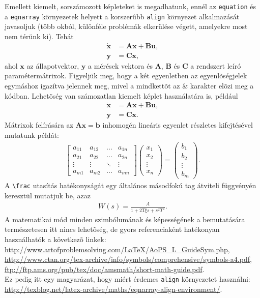Emellett kiemelt, sorszámozott képleteket is megadhatunk, ennél az \verb+equation+ és a \verb+eqnarray+ környezetek helyett a korszerûbb \verb+align+ környezet alkalmazását javasoljuk (több okból, különféle problémák elkerülése végett, amelyekre most nem térünk ki). Tehát
\begin{align}
\dot{\mathbf{x}}&=\mathbf{A}\mathbf{x}+\mathbf{B}\mathbf{u},\\
\mathbf{y}&=\mathbf{C}\mathbf{x},
\end{align}
ahol $\mathbf{x}$ az állapotvektor, $\mathbf{y}$ a mérések vektora és $\mathbf{A}$, $\mathbf{B}$ és $\mathbf{C}$ a rendszert leíró paramétermátrixok. Figyeljük meg, hogy a két egyenletben az egyenlõségjelek egymáshoz igazítva jelennek meg, mivel a mindkettõt az \& karakter elõzi meg a kódban. Lehetõség van számozatlan kiemelt képlet használatára is, például
\begin{align}
\dot{\mathbf{x}}&=\mathbf{A}\mathbf{x}+\mathbf{B}\mathbf{u},\nonumber\\
\mathbf{y}&=\mathbf{C}\mathbf{x}\nonumber.
\end{align}
Mátrixok felírására az $\mathbf{A}\mathbf{x}=\mathbf{b}$ inhomogén lineáris egyenlet részletes kifejtésével mutatunk példát:
\begin{align}
\begin{bmatrix}
a_{11} & a_{12} & \dots & a_{1n}\\
a_{21} & a_{22} & \dots & a_{2n}\\
\vdots & \vdots & \ddots & \vdots\\
a_{m1} & a_{m2} & \dots & a_{mn}
\end{bmatrix}
\begin{pmatrix}x_1\\x_2\\\vdots\\x_n\end{pmatrix}=
\begin{pmatrix}b_1\\b_2\\\vdots\\b_m\end{pmatrix}.
\end{align}
A \verb+\frac+ utasítás hatékonyságát egy általános másodfokú tag átviteli függvényén keresztül mutatjuk be, azaz
\begin{align}
W(s)=\frac{A}{1+2T\xi s+s^2T^2}.
\end{align}
A matematikai mód minden szimbólumának és képességének a bemutatására természetesen itt nincs lehetõség, de gyors referenciaként hatékonyan használhatók a következõ linkek:\\
\indent\url{http://www.artofproblemsolving.com/LaTeX/AoPS_L_GuideSym.php},\\
\indent\url{http://www.ctan.org/tex-archive/info/symbols/comprehensive/symbols-a4.pdf},\\
\indent\url{ftp://ftp.ams.org/pub/tex/doc/amsmath/short-math-guide.pdf}.\\
Ez pedig itt egy magyarázat, hogy miért érdemes \verb+align+ környezetet használni:\\
\indent\url{http://texblog.net/latex-archive/maths/eqnarray-align-environment/}.

